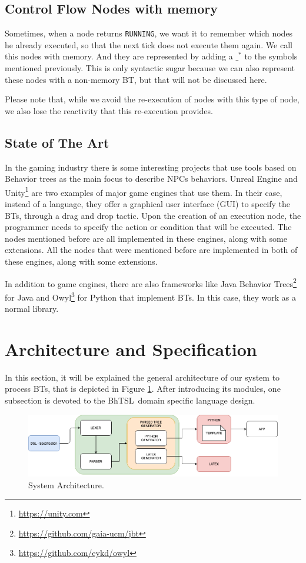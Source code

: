\documentclass[a4paper,UKenglish,cleveref, autoref, thm-restate]{oasics-v2019}
\def\bht{BhTSL}
\begin{document}
\subsection{Control Flow Nodes with memory}
Sometimes, when a node returns \texttt{RUNNING}, we want it to remember which nodes he already executed, so that the next tick does not execute them again.
We call this nodes with memory.
And they are represented by adding a $\_^*$ to the symbols mentioned previously.
This is only syntactic sugar because we can also represent these nodes with a non-memory BT, 
but that will not be discussed here.

Please note that, while we avoid the re-execution of nodes with this type of node, we also lose the reactivity that this re-execution provides.

\subsection{State of The Art}
\label{subsec:state-of-the-art}
In the gaming industry there is some interesting projects that use tools based on Behavior trees as the main focus to describe NPCs behaviors.
Unreal Engine \cite{UnrealEngine} and Unity\footnote{\raggedright\url{https://unity.com}} are two examples of major game engines that use them.
In their case, instead of a language, they offer a graphical user interface (GUI) to specify the BTs, through a drag and drop tactic.
Upon the creation of an execution node, the programmer needs to specify the action or condition that will be executed.
The nodes mentioned before are all implemented in these engines, along with some extensions.
All the nodes that were mentioned before are implemented in both of these engines, along with some extensions.

In addition to game engines, there are also frameworks like Java Behavior Trees\footnote{\url{https://github.com/gaia-ucm/jbt}} for Java and Owyl\footnote{\url{https://github.com/eykd/owyl}} for Python that implement BTs.
In this case, they work as a normal library.

\section{Architecture and Specification}
\label{sec:arc-spec}
In this section, it will be explained the general architecture of our system to process BTs,
that is depicted in Figure \ref{fig:architecture}.
After introducing its modules, one subsection is devoted to the \bht\ domain specific language design.
\begin{figure}[h]
    \includegraphics[width=\columnwidth]{architecture.png}
    \caption{System Architecture.}
    \label{fig:architecture}
\end{figure}
\end{document}
